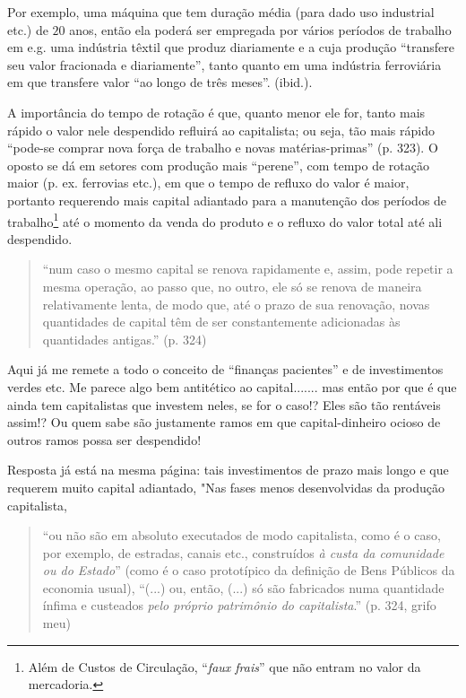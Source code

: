 Por exemplo, uma máquina que tem duração média (para dado uso industrial etc.) de $20$ anos, então ela poderá ser empregada por vários períodos de trabalho em e.g. uma indústria têxtil que produz diariamente e a cuja produção ``transfere seu valor fracionada e diariamente'', tanto quanto em uma indústria ferroviária em que transfere valor ``ao longo de três meses''. (ibid.).

A importância do tempo de rotação é que, quanto menor ele for, tanto mais rápido o valor nele despendido refluirá ao capitalista; ou seja, tão mais rápido ``pode-se comprar nova força de trabalho e novas matérias-primas'' (p. 323). O oposto se dá em setores com produção mais ``perene'', com tempo de rotação maior (p. ex. ferrovias etc.), em que o tempo de refluxo do valor é maior, portanto requerendo mais capital adiantado para a manutenção dos períodos de trabalho\footnote{Além de Custos de Circulação, ``\textit{faux frais}'' que não entram no valor da mercadoria. } até o momento da venda do produto e o refluxo do valor total até ali despendido.
\begin{quote}
``num caso o mesmo capital se renova rapidamente e, assim, pode repetir a mesma operação, ao passo que, no outro, ele só se renova de maneira relativamente lenta, de modo que, até o prazo de sua renovação, novas quantidades de capital têm de ser constantemente adicionadas às quantidades antigas.'' (p. 324)
\end{quote}

Aqui já me remete a todo o conceito de ``finanças pacientes'' e de investimentos verdes etc. Me parece algo bem antitético ao capital....... mas então por que é que ainda tem capitalistas que investem neles, se for o caso!? Eles são tão rentáveis assim!? Ou quem sabe são justamente ramos em que capital-dinheiro ocioso de outros ramos possa ser despendido!

Resposta já está na mesma página: tais investimentos de prazo mais longo e que requerem muito capital adiantado, "Nas fases menos desenvolvidas da produção capitalista, 
\begin{quote}
``ou não são em absoluto executados de modo capitalista, como é o caso, por exemplo, de estradas, canais etc., construídos \textit{à custa da comunidade ou do Estado}'' (como é o caso prototípico da definição de Bens Públicos da economia usual), ``(...) ou, então, (...) só são fabricados numa quantidade ínfima e custeados \textit{pelo próprio patrimônio do capitalista}.'' (p. 324, grifo meu)
\end{quote}


